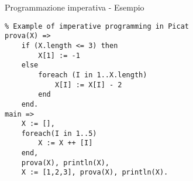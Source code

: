 \begin{frame}[fragile, shrink=20]{Programmazione imperativa - Esempio}

	\begin{lstlisting}
% Example of imperative programming in Picat
prova(X) =>
	if (X.length <= 3) then
		X[1] := -1
	else
		foreach (I in 1..X.length)
			X[I] := X[I] - 2
		end
	end.
main =>
	X := [],
	foreach(I in 1..5)
		X := X ++ [I]
	end,
	prova(X), println(X),
	X := [1,2,3], prova(X), println(X).
	\end{lstlisting}
	
\end{frame}
